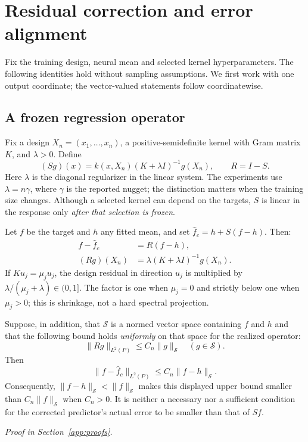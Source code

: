 \section{Residual correction and error alignment}\label{sec:identity}

Fix the training design, neural mean and selected kernel hyperparameters. The following
identities hold without sampling assumptions. We first work with one output coordinate;
the vector-valued statements follow coordinatewise.

\subsection{A frozen regression operator}
Fix a design $X_n=(x_1,\ldots,x_n)$, a positive-semidefinite kernel with Gram matrix $K$, and
$\lambda>0$. Define
\begin{equation}\label{eq:krr}
 (Sg)(x)=k(x,X_n)(K+\lambda I)^{-1}g(X_n),\qquad R=I-S.
\end{equation}
Here $\lambda$ is the diagonal regularizer in the linear system. The experiments use
$\lambda=n\gamma$, where $\gamma$ is the reported nugget; the distinction matters when the
training size changes. Although a selected kernel can depend on the targets, $S$ is linear
in the response only \emph{after that selection is frozen}.

\begin{proposition}\label{prop:identity}
Let $f$ be the target and $h$ any fitted mean, and set
$\widehat f_c=h+S(f-h)$. Then:
\begin{align}
 f-\widehat f_c&=R(f-h),\label{eq:residual-exact}\\
 (Rg)(X_n)&=\lambda(K+\lambda I)^{-1}g(X_n).\label{eq:design-residual}
\end{align}
If $K u_j=\mu_j u_j$, the design residual in direction $u_j$ is multiplied by
$\lambda/(\mu_j+\lambda)\in(0,1]$. The factor is one when $\mu_j=0$ and strictly below one
when $\mu_j>0$; this is shrinkage, not a hard spectral projection.

Suppose, in addition, that $\mathcal S$ is a normed vector space containing $f$ and $h$ and
that the following bound holds \emph{uniformly} on that space for the realized operator:
\[
 \|Rg\|_{L^2(P)}\le C_n\|g\|_{\mathcal S}\quad(g\in\mathcal S).
\]
Then
\begin{equation}\label{eq:inherit}
 \|f-\widehat f_c\|_{L^2(P)}\le C_n\|f-h\|_{\mathcal S}.
\end{equation}
Consequently, $\|f-h\|_{\mathcal S}<\|f\|_{\mathcal S}$ makes this displayed upper bound
smaller than $C_n\|f\|_{\mathcal S}$ when $C_n>0$. It is neither a necessary nor a
sufficient condition for the corrected predictor's actual error to be smaller than that of
$Sf$.
\end{proposition}
\noindent\emph{Proof in Section~\ref{app:proofs}.}
